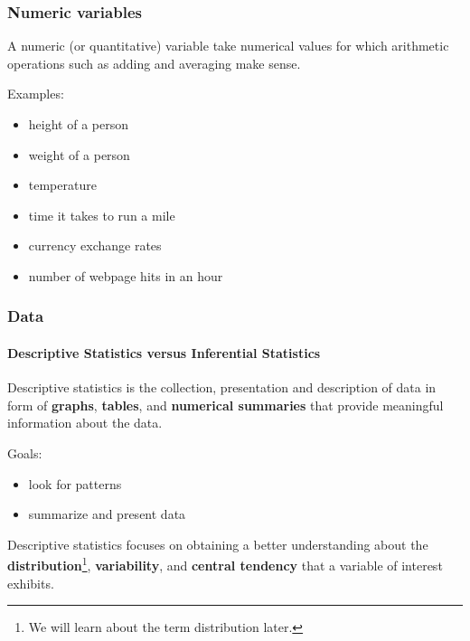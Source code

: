 \documentclass[handout]{beamer}
\begin{document}
\begin{frame}
\frametitle{Numeric variables}

\begin{definition}
A \alert{numeric (or quantitative) variable} 
take numerical values 
\pause
for which arithmetic
operations such as adding and averaging make sense.
\end{definition}

\vspace{0.1in} \pause

Examples:
\begin{itemize}
\item height of a person
\item weight of a person
\item temperature
\item time it takes to run a mile
\item currency exchange rates
\item number of webpage hits in an hour
\end{itemize}
\end{frame}



\begin{frame}\frametitle{Data}
\framesubtitle{Descriptive Statistics versus Inferential Statistics}

\begin{definition}
\alert{Descriptive statistics} is the collection,
presentation and description of data in form of \textbf{graphs},
\textbf{tables},
and \textbf{numerical summaries} that provide meaningful information about the data.
\end{definition}

\vspace{0.1in}

Goals:
\begin{itemize}
\item look for patterns
\item summarize and present data
\end{itemize}

\vspace{0.1in}

Descriptive statistics focuses on obtaining a better understanding about the 
\textbf{distribution}\footnote{We will learn about the term distribution later.}, 
\textbf{variability}, and \textbf{central tendency} that a variable of interest exhibits.

\end{frame}
\end{document}
